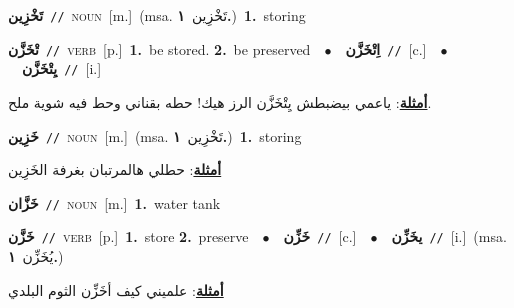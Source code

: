 \documentclass[10pt,a4paper,twoside]{article} %
\begin{document}
\begin{multicols}{2}
{\setlength\topsep{0pt}\textbf{\foreignlanguage{arabic}{تَخْزِين}}\ {\color{gray}\texttt{//}\color{black}}\ \textsc{noun}\ [m.]\ \color{gray}(msa. \foreignlanguage{arabic}{تَخْزِين}~\foreignlanguage{arabic}{\textbf{١.}})\color{black}\ \textbf{1.}~storing\ } \vspace{2mm}

{\setlength\topsep{0pt}\textbf{\foreignlanguage{arabic}{تْخَزَّن}}\ {\color{gray}\texttt{//}\color{black}}\ \textsc{verb}\ [p.]\ \textbf{1.}~be stored.  \textbf{2.}~be preserved\ \ $\bullet$\ \ \setlength\topsep{0pt}\textbf{\foreignlanguage{arabic}{اِتْخَزَّن}}\ {\color{gray}\texttt{//}\color{black}}\ [c.]\ \ $\bullet$\ \ \setlength\topsep{0pt}\textbf{\foreignlanguage{arabic}{يِتْخَزَّن}}\ {\color{gray}\texttt{//}\color{black}}\ [i.]\  \begin{flushright}\color{gray}\foreignlanguage{arabic}{\textbf{\underline{\foreignlanguage{arabic}{أمثلة}}}: ياعمي بيضبطش يِتْخَزَّن الرز هيك! حطه بقناني وحط فيه شوية ملح.}\end{flushright}\color{black}} \vspace{2mm}

{\setlength\topsep{0pt}\textbf{\foreignlanguage{arabic}{خَزِين}}\ {\color{gray}\texttt{//}\color{black}}\ \textsc{noun}\ [m.]\ \color{gray}(msa. \foreignlanguage{arabic}{تَخْزِين}~\foreignlanguage{arabic}{\textbf{١.}})\color{black}\ \textbf{1.}~storing\  \begin{flushright}\color{gray}\foreignlanguage{arabic}{\textbf{\underline{\foreignlanguage{arabic}{أمثلة}}}: حطلي هالمرتبان بغرفة الخَزِين}\end{flushright}\color{black}} \vspace{2mm}

{\setlength\topsep{0pt}\textbf{\foreignlanguage{arabic}{خَزَّان}}\ {\color{gray}\texttt{//}\color{black}}\ \textsc{noun}\ [m.]\ \textbf{1.}~water tank\ } \vspace{2mm}

{\setlength\topsep{0pt}\textbf{\foreignlanguage{arabic}{خَزَّن}}\ {\color{gray}\texttt{//}\color{black}}\ \textsc{verb}\ [p.]\ \textbf{1.}~store  \textbf{2.}~preserve\ \ $\bullet$\ \ \setlength\topsep{0pt}\textbf{\foreignlanguage{arabic}{خَزِّن}}\ {\color{gray}\texttt{//}\color{black}}\ [c.]\ \ $\bullet$\ \ \setlength\topsep{0pt}\textbf{\foreignlanguage{arabic}{يخَزِّن}}\ {\color{gray}\texttt{//}\color{black}}\ [i.]\ \color{gray}(msa. \foreignlanguage{arabic}{يُخَزِّن}~\foreignlanguage{arabic}{\textbf{١.}})\color{black}\  \begin{flushright}\color{gray}\foreignlanguage{arabic}{\textbf{\underline{\foreignlanguage{arabic}{أمثلة}}}: علميني كيف أخَزِّن الثوم البلدي}\end{flushright}\color{black}} \vspace{2mm}


\end{multicols}
\end{document}
